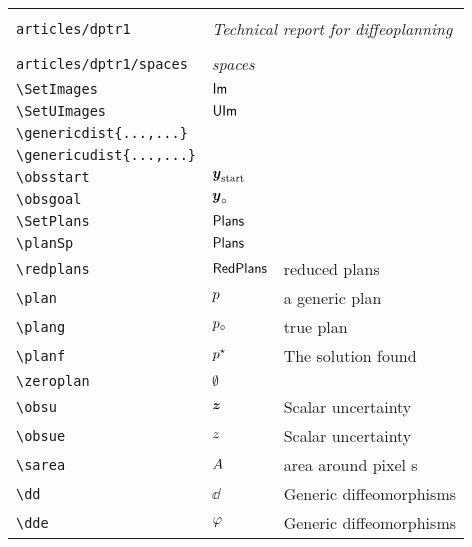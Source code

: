 \begin{longtable}{lll}
  &  & \\ 
 {\color[rgb]{0.5,0.5,0.5}\texttt{articles/dptr1}} & \multicolumn{2}{l}{\emph{Technical report for diffeoplanning}}\\ 
 \hline
 &  & \\ 
 {\color[rgb]{0.5,0.5,0.5}\texttt{articles/dptr1/spaces}} & \multicolumn{2}{l}{\emph{spaces}}\\ 
 \hline
{\color[rgb]{0.5,0.5,0.5}\texttt{\textbackslash SetImages}} & $\mathsf{Im}$ & \\ 
 {\color[rgb]{0.5,0.5,0.5}\texttt{\textbackslash SetUImages}} & $\mathsf{UIm}$ & \\ 
 {\color[rgb]{0.5,0.5,0.5}\texttt{\textbackslash genericdist\{...,...\}}} &  & \\ 
 {\color[rgb]{0.5,0.5,0.5}\texttt{\textbackslash genericudist\{...,...\}}} &  & \\ 
 {\color[rgb]{0.5,0.5,0.5}\texttt{\textbackslash obsstart}} & $\boldsymbol{y}_{\text{start}}$ & \\ 
 {\color[rgb]{0.5,0.5,0.5}\texttt{\textbackslash obsgoal}} & $\boldsymbol{y}_{\circ}$ & \\ 
 {\color[rgb]{0.5,0.5,0.5}\texttt{\textbackslash SetPlans}} & $\mathsf{Plans}$ & \\ 
 {\color[rgb]{0.5,0.5,0.5}\texttt{\textbackslash planSp}} & $\mathsf{Plans}$ & \\ 
 {\color[rgb]{0.5,0.5,0.5}\texttt{\textbackslash redplans}} & $\mathsf{RedPlans}$ &  reduced plans\\ 
 {\color[rgb]{0.5,0.5,0.5}\texttt{\textbackslash plan}} & $p$ &  a generic plan\\ 
 {\color[rgb]{0.5,0.5,0.5}\texttt{\textbackslash plang}} & $p_{\circ}$ &  true plan\\ 
 {\color[rgb]{0.5,0.5,0.5}\texttt{\textbackslash planf}} & $p^\star$ &  The solution found \\ 
 {\color[rgb]{0.5,0.5,0.5}\texttt{\textbackslash zeroplan}} & $\emptyset$ & \\ 
 {\color[rgb]{0.5,0.5,0.5}\texttt{\textbackslash obsu}} & $\boldsymbol{z}$ &  Scalar uncertainty\\ 
 {\color[rgb]{0.5,0.5,0.5}\texttt{\textbackslash obsue}} & $z$ &  Scalar uncertainty\\ 
 {\color[rgb]{0.5,0.5,0.5}\texttt{\textbackslash sarea}} & $A$ &  area around pixel s\\ 
 {\color[rgb]{0.5,0.5,0.5}\texttt{\textbackslash dd}} & $\dd$ &  Generic diffeomorphisms\\ 
 {\color[rgb]{0.5,0.5,0.5}\texttt{\textbackslash dde}} & $\varphi$ &  Generic diffeomorphisms\\ 

\end{longtable}
